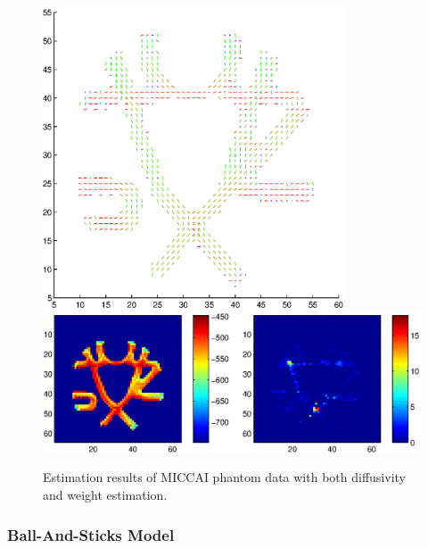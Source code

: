 \documentclass{article}
\begin{document}
\begin{figure}[H]
  \caption{Estimation results of MICCAI phantom data with both diffusivity and weight estimation.}
  \centering
  \includegraphics[width=0.8\textwidth]{figures/phantom_modbas_weights_diffus_dir.eps}
  \includegraphics[width=\textwidth]{figures/phantom_modbas_weights_diffus_like.eps}
\end{figure}

\subsubsection{Ball-And-Sticks Model}
\end{document}
